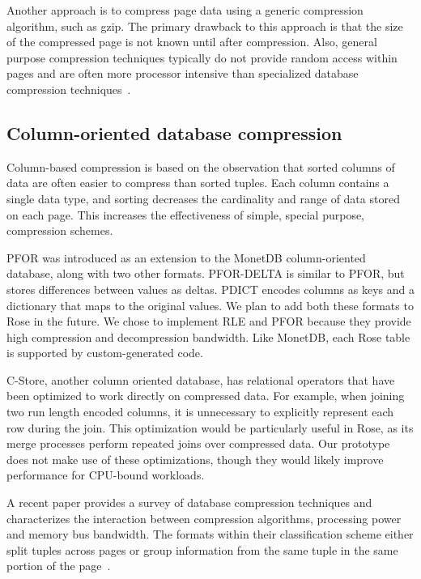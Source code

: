 \documentclass{vldb}
\newcommand{\rows}{Rose\xspace}
\newcommand{\xxx}[1]{\textcolor{red}{\bf XXX: #1}}
\renewcommand{\xxx}[1]{\xspace}
\begin{document}
Another approach is to compress page data using a generic compression
algorithm, such as gzip.  The primary drawback to this approach is
that the size of the compressed page is not known until after
compression.  Also, general purpose compression techniques typically
do not provide random access within pages and are often more processor
intensive than specialized database compression
techniques~\cite{rowImplementationPerf}.

\subsection{Column-oriented database compression}

Column-based compression is based on the observation that sorted
columns of data are often easier to compress than sorted tuples.  Each
column contains a single data type, and sorting decreases the
cardinality and range of data stored on each page.  This increases the
effectiveness of simple, special purpose, compression schemes.

PFOR was introduced as an extension to
the MonetDB\cite{pfor} column-oriented database, along with two other
formats.  PFOR-DELTA is similar to PFOR, but stores differences between values as
deltas.\xxx{check}  PDICT encodes columns as keys and a dictionary that
maps to the original values.  We plan to add both these formats to
\rows in the future.  We chose to implement RLE and PFOR because they
provide high compression and decompression bandwidth.  Like MonetDB,
each \rows table is supported by custom-generated code.

C-Store, another column oriented database, has relational operators
that have been optimized to work directly on compressed
data\cite{compExec}.  For example, when joining two run length encoded
columns, it is unnecessary to explicitly represent each row during the
join.  This optimization would be particularly useful in \rows, as its
merge processes perform repeated joins over compressed data.  Our
prototype does not make use of these optimizations, though they would
likely improve performance for CPU-bound workloads.

A recent paper provides a survey of database compression techniques
and characterizes the interaction between compression algorithms,
processing power and memory bus bandwidth.  The formats within their
classification scheme either split tuples across pages or group
information from the same tuple in the same portion of the
page~\cite{bitsForChronos}.
\end{document}
